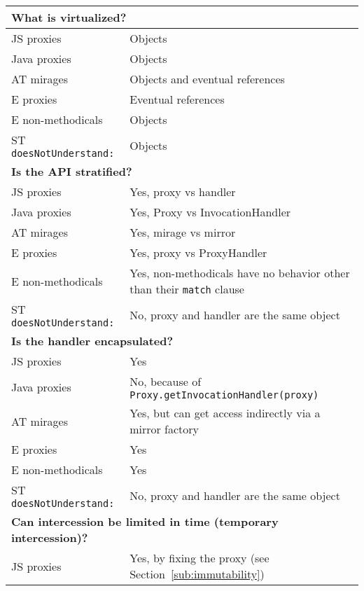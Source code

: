 \documentclass{acm_proc_article-sp}
\begin{document}
\begin{table*}
\centering
\begin{tabular}{|p{}|p{}|}
    \hline
    \multicolumn{2}{|l|}{\textbf{What is virtualized?}}\\
    \hline
    JS proxies        & Objects\\
    Java proxies      & Objects\\
    AT mirages        & Objects and eventual references\\
    E proxies         & Eventual references\\
    E non-methodicals & Objects\\
    ST \texttt{doesNotUnderstand:}  & Objects\\
    \hline
    \multicolumn{2}{|l|}{\textbf{Is the API stratified?}}\\
    \hline
    JS proxies        & Yes, proxy vs handler\\
    Java proxies      & Yes, Proxy vs InvocationHandler\\
    AT mirages        & Yes, mirage vs mirror\\
    E proxies         & Yes, proxy vs ProxyHandler\\
    E non-methodicals & Yes, non-methodicals have no behavior other than their \texttt{match} clause\\
    ST \texttt{doesNotUnderstand:}  & No, proxy and handler are the same object\\
    \hline
    \multicolumn{2}{|l|}{\textbf{Is the handler encapsulated?}}\\
    \hline
    JS proxies        & Yes\\
    Java proxies      & No, because of \texttt{Proxy.getInvocationHandler(proxy)}\\
    AT mirages        & Yes, but can get access indirectly via a mirror factory\\
    E proxies         & Yes\\
    E non-methodicals & Yes\\
    ST \texttt{doesNotUnderstand:}  & No, proxy and handler are the same object\\
    \hline
    \multicolumn{2}{|l|}{\textbf{Can intercession be limited in time (temporary intercession)?}}\\
    \hline
    JS proxies        & Yes, by fixing the proxy (see Section~\ref{sub:immutability})\\

\end{tabular}
\end{table*}
\end{document}
